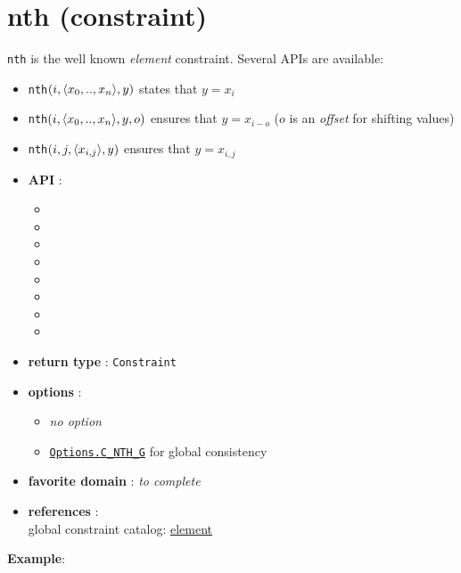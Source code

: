 \label{nth}
\hypertarget{nth}{}

\section{nth (constraint)}\label{nth:nthconstraint}\hypertarget{nth:nthconstraint}{}
\texttt{nth} is the well known \emph{element} constraint.
Several APIs are available: 

\begin{notedef}
\begin{itemize}
\item \texttt{nth}$(i,\langle x_0,..,x_{n}\rangle,y)$ states that $y=x_i$
\item \texttt{nth}$(i,\langle x_0,..,x_{n}\rangle,y,o)$ ensures that $y=x_{i-o}$ ($o$ is an \emph{offset} for shifting values)
\item \texttt{nth}$(i,j,\langle x_{i,j}\rangle,y)$ ensures that $y=x_{i,j}$
\end{itemize}
\end{notedef}

\begin{itemize}
	\item \textbf{API} :
	\begin{itemize}
		\item {}
		\item {}
		\item {}
		\item {}
		\item {}		
		\item {}
		\item {}
		\item {}
	\end{itemize}
	\item \textbf{return type} : \texttt{Constraint}
	\item \textbf{options} :
	\begin{itemize}
		\item \emph{no option} 
		\item \hyperlink{cnthg:cnthgoptions}{\tt Options.C\_NTH\_G} for global consistency
	\end{itemize}
	\item \textbf{favorite domain} : \emph{to complete}
	\item \textbf{references} :\\
      global constraint catalog: \href{http://www.emn.fr/x-info/sdemasse/gccat/Celement.html}{element}
\end{itemize}

\textbf{Example}:
 
